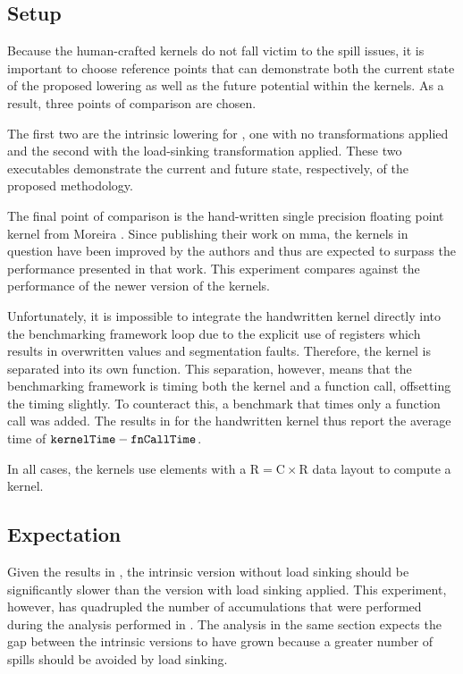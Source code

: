 \documentclass[\main/thesis.tex]{subfiles}
\begin{document}
\subsection{Setup}
Because the human-crafted kernels do not fall victim to the spill issues, it is important to choose reference points that can demonstrate both the current state of the proposed \gls{lowering} as well as the future potential within the kernels.
As a result, three points of comparison are chosen.

The first two are the intrinsic \gls{lowering} for , one with no transformations applied and the second with the load-sinking transformation applied.
These two executables demonstrate the current and future state, respectively, of the proposed methodology.

The final point of comparison is the hand-written single precision floating point kernel from Moreira \etal.
Since publishing their work on \gls{mma}, the kernels in question have been improved by the authors and thus are expected to surpass the performance presented in that work.
This experiment compares against the performance of the newer version of the kernels.

Unfortunately, it is impossible to integrate the handwritten kernel directly into the benchmarking framework loop due to the explicit use of registers which results in overwritten values and segmentation faults.
Therefore, the kernel is separated into its own function.
This separation, however, means that the benchmarking framework is timing both the kernel and a function call, offsetting the timing slightly.
To counteract this, a benchmark that times only a function call was added.
The results in  for the handwritten kernel thus report the average time of $\textrm{\code{kernelTime}} - \textrm{\code{fnCallTime}}$.

In all cases, the kernels use  elements with a $\textrm{R} = \textrm{C} \times \textrm{R}$ data layout to compute a  kernel.

\subsection{Expectation}
Given the results in , the intrinsic version without load sinking should be significantly slower than the version with load sinking applied.
This experiment, however, has quadrupled the number of accumulations that were performed during the analysis performed in .
The analysis in the same section expects the gap between the intrinsic versions to have grown because a greater number of spills should be avoided by load sinking.
\end{document}
